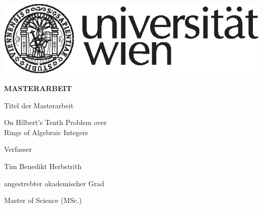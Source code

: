 

\begin{titlepage}
\begin{flushright}
    \includegraphics{uni-logo}
\end{flushright}
\vspace{0.5cm}

\begin{center}  %
    \Huge{\textsf{\textbf{\MakeUppercase{
        Masterarbeit
    }}}}
    \vspace{1.5cm}

    \large{\textsf{  %
        Titel der Masterarbeit
    }}
    \vspace{.1cm}

    \LARGE{\textsf{ On Hilbert's Tenth Problem over\\
                    Rings of Algebraic Integers
    }}
    \vfill

    \large{\textsf{  %
        Verfasser
    }}

    \Large{\textsf{  Tim Benedikt Herbstrith
    }}
    \vfill

    \large{\textsf{
        angestrebter akademischer Grad  %
    }}

    \Large{\textsf{  %
        Master of Science (MSc.)
    }}


\end{center}
\end{titlepage}
